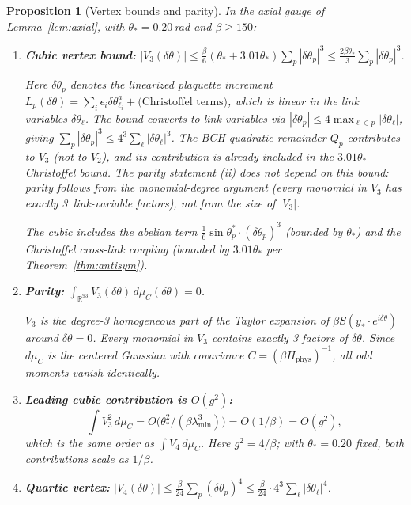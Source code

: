 \documentclass[11pt]{article}
\newtheorem{proposition}[theorem]{Proposition}
\theoremstyle{definition}
\newcommand{\R}{\mathbb{R}}
\begin{document}
\begin{proposition}[Vertex bounds and parity]\label{prop:vertex}
In the axial gauge of Lemma~\ref{lem:axial}, with $\theta_*=0.20$\,rad
and $\beta\ge 150$:
\begin{enumerate}[nosep,label=(\roman*)]
\item \textbf{Cubic vertex bound:}
$|V_3(\delta\theta)|
\le\frac{\beta}{6}(\theta_*+3.01\theta_*)\sum_p|\delta\theta_p|^3
\le\frac{2\beta\theta_*}{3}\sum_p|\delta\theta_p|^3$.

Here $\delta\theta_p$ denotes the \emph{linearized plaquette
increment} $L_p(\delta\theta)=\sum_i\epsilon_i\delta\theta_{\ell_i}^a
+\text{(Christoffel terms)}$, which is \emph{linear} in the
link variables $\delta\theta_\ell$.  The bound converts to link
variables via $|\delta\theta_p|\le 4\max_{\ell\in p}
|\delta\theta_\ell|$, giving
$\sum_p|\delta\theta_p|^3\le 4^3\sum_\ell|\delta\theta_\ell|^3$.
The BCH quadratic remainder $Q_p$ contributes to $V_3$ (not to
$V_2$), and its contribution is already included in the
$3.01\theta_*$ Christoffel bound.
\emph{The parity statement (ii) does not depend on this bound}:
parity follows from the monomial-degree argument (every monomial
in $V_3$ has exactly 3~link-variable factors), not from the
size of $|V_3|$.

The cubic includes the abelian term
$\frac{1}{6}\sin\theta_p^*\cdot(\delta\theta_p)^3$ (bounded by
$\theta_*$) and the Christoffel cross-link coupling
(bounded by $3.01\theta_*$ per Theorem~\ref{thm:antisym}).

\item \textbf{Parity:}
$\int_{\R^{93}} V_3(\delta\theta)\,d\mu_C(\delta\theta) = 0$.

$V_3$ is the degree-3 homogeneous part of the Taylor expansion
of $\beta S(y_*\cdot e^{i\delta\theta})$ around $\delta\theta=0$.
Every monomial in $V_3$ contains \emph{exactly 3} factors of
$\delta\theta$.  Since $d\mu_C$ is the centered Gaussian with
covariance $C=(\beta H_{\mathrm{phys}})^{-1}$, all odd moments
vanish identically.

\item \textbf{Leading cubic contribution is $O(g^2)$:}
\begin{equation}\label{eq:V3sq-scale}
\int V_3^2\,d\mu_C=O\bigl(\theta_*^2/(\beta\lambda_{\min}^3)\bigr)
=O(1/\beta)=O(g^2),
\end{equation}
which is the same order as $\int V_4\,d\mu_C$.  Here $g^2=4/\beta$;
with $\theta_*=0.20$ fixed, both contributions scale as $1/\beta$.

\item \textbf{Quartic vertex:}
$|V_4(\delta\theta)|
\le\frac{\beta}{24}\sum_p(\delta\theta_p)^4
\le\frac{\beta}{24}\cdot 4^3\sum_\ell|\delta\theta_\ell|^4$.
\end{enumerate}
\end{proposition}
\end{document}
